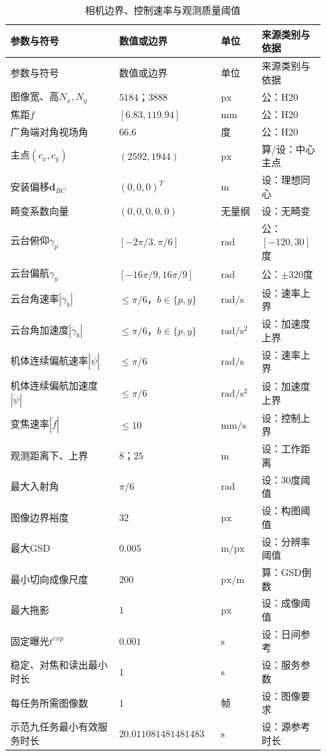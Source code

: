 \begin{longtable}{@{}p{0.32\linewidth}p{0.28\linewidth}p{0.12\linewidth}p{0.18\linewidth}@{}}
\caption{相机边界、控制速率与观测质量阈值}\label{s0601:camera_parameters}\\
\toprule
参数与符号 & 数值或边界 & 单位 & 来源类别与依据\\
\midrule
\endfirsthead
\toprule
参数与符号 & 数值或边界 & 单位 & 来源类别与依据\\
\midrule
\endhead
\bottomrule
\endfoot
图像宽、高$N_x,N_y$ & $5184$；$3888$ & $\mathrm{px}$ & 公：H20\\
焦距$f$ & $[6.83,119.94]$ & $\mathrm{mm}$ & 公：H20\\
广角端对角视场角 & $66.6$ & 度 & 公：H20\\
主点$(c_x,c_y)$ & $(2592,1944)$ & $\mathrm{px}$ & 算/设：中心主点\\
安装偏移$\mathbf d_{BC}$ & $(0,0,0)^T$ & $\mathrm m$ & 设：理想同心\\
畸变系数向量 & $(0,0,0,0,0)$ & 无量纲 & 设：无畸变\\
云台俯仰$\gamma_p$ & $[-2\pi/3,\pi/6]$ & $\mathrm{rad}$ & 公：$[-120,30]$度\\
云台偏航$\gamma_y$ & $[-16\pi/9,16\pi/9]$ & $\mathrm{rad}$ & 公：$\pm320$度\\
云台角速率$|\dot\gamma_b|$ & $\le\pi/6$，$b\in\{p,y\}$ & $\mathrm{rad/s}$ & 设：速率上界\\
云台角加速度$|\ddot\gamma_b|$ & $\le\pi/6$，$b\in\{p,y\}$ & $\mathrm{rad/s^2}$ & 设：加速度上界\\
机体连续偏航速率$|\dot\psi|$ & $\le\pi/6$ & $\mathrm{rad/s}$ & 设：速率上界\\
机体连续偏航加速度$|\ddot\psi|$ & $\le\pi/6$ & $\mathrm{rad/s^2}$ & 设：加速度上界\\
变焦速率$|\dot f|$ & $\le10$ & $\mathrm{mm/s}$ & 设：控制上界\\
观测距离下、上界 & $8$；$25$ & $\mathrm m$ & 设：工作距离\\
最大入射角 & $\pi/6$ & $\mathrm{rad}$ & 设：30度阈值\\
图像边界裕度 & $32$ & $\mathrm{px}$ & 设：构图阈值\\
最大GSD & $0.005$ & $\mathrm{m/px}$ & 设：分辨率阈值\\
最小切向成像尺度 & $200$ & $\mathrm{px/m}$ & 算：GSD倒数\\
最大拖影 & $1$ & $\mathrm{px}$ & 设：成像阈值\\
固定曝光$t^{exp}$ & $0.001$ & $\mathrm s$ & 设：日间参考\\
稳定、对焦和读出最小时长 & $1$ & $\mathrm s$ & 设：服务参数\\
每任务所需图像数 & $1$ & 帧 & 设：图像要求\\
示范九任务最小有效服务时长 & $20.011081481481483$ & $\mathrm s$ & 设：源参考时长\\
\end{longtable}

